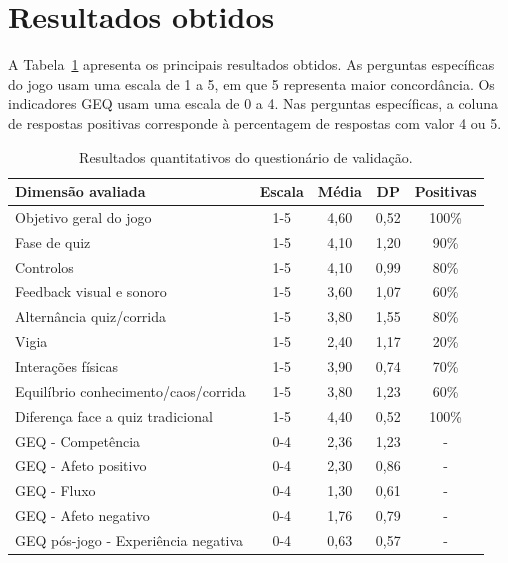 \section{Resultados obtidos}
\label{sec:resultados}

A Tabela~\ref{tab:resultados} apresenta os principais resultados obtidos. As perguntas específicas do jogo usam uma escala de 1 a 5, em que 5 representa maior concordância. Os indicadores GEQ usam uma escala de 0 a 4. Nas perguntas específicas, a coluna de respostas positivas corresponde à percentagem de respostas com valor 4 ou 5.

\begin{table}[H]
   \centering
   \caption{Resultados quantitativos do questionário de validação.}
   \label{tab:resultados}
   \small
   \begin{tabular}{|p{6.2cm}|c|c|c|c|}
      \hline
      \textbf{Dimensão avaliada} & \textbf{Escala} & \textbf{Média} & \textbf{DP} & \textbf{Positivas}
      \\ \hline
      Objetivo geral do jogo & 1-5 & 4,60 & 0,52 & 100\%
      \\ \hline
      Fase de quiz & 1-5 & 4,10 & 1,20 & 90\%
      \\ \hline
      Controlos & 1-5 & 4,10 & 0,99 & 80\%
      \\ \hline
      Feedback visual e sonoro & 1-5 & 3,60 & 1,07 & 60\%
      \\ \hline
      Alternância quiz/corrida & 1-5 & 3,80 & 1,55 & 80\%
      \\ \hline
      Vigia & 1-5 & 2,40 & 1,17 & 20\%
      \\ \hline
      Interações físicas & 1-5 & 3,90 & 0,74 & 70\%
      \\ \hline
      Equilíbrio conhecimento/caos/corrida & 1-5 & 3,80 & 1,23 & 60\%
      \\ \hline
      Diferença face a quiz tradicional & 1-5 & 4,40 & 0,52 & 100\%
      \\ \hline
      GEQ - Competência & 0-4 & 2,36 & 1,23 & -
      \\ \hline
      GEQ - Afeto positivo & 0-4 & 2,30 & 0,86 & -
      \\ \hline
      GEQ - Fluxo & 0-4 & 1,30 & 0,61 & -
      \\ \hline
      GEQ - Afeto negativo & 0-4 & 1,76 & 0,79 & -
      \\ \hline
      GEQ pós-jogo - Experiência negativa & 0-4 & 0,63 & 0,57 & -
      \\ \hline
   \end{tabular}
\end{table}

